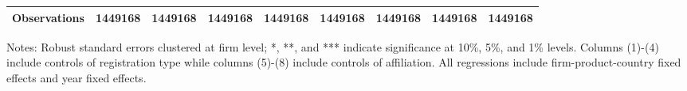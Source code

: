 \begin{table}
\begin{threeparttable}
\begin{tabular}{lcccccccc}
			Observations & 1449168 & 1449168 & 1449168 & 1449168 & 1449168 & 1449168 & 1449168 & 1449168\\
			\bottomrule
		\end{tabular}
		\begin{tablenotes}
			\footnotesize
			\item Notes: Robust standard errors clustered at firm level; *, **, and *** indicate significance at 10\%, 5\%, and 1\% levels. Columns (1)-(4) include controls of registration type while columns (5)-(8) include controls of affiliation. All regressions include firm-product-country fixed effects and year fixed effects.
		\end{tablenotes}
	\end{threeparttable}
	\label{tab.robust.ownership}
\end{table}

